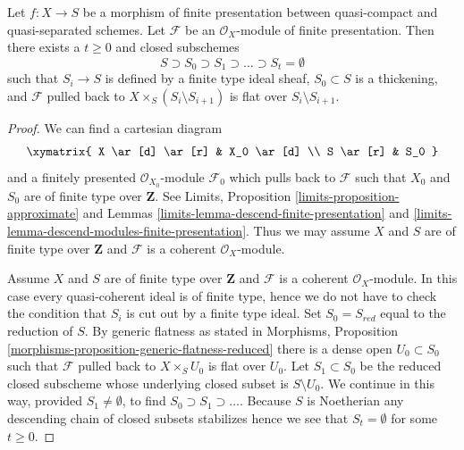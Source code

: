 \begin{lemma}
\label{lemma-generic-flatness-stratification}
Let $f : X \to S$ be a morphism of finite presentation between quasi-compact
and quasi-separated schemes. Let $\mathcal{F}$ be an $\mathcal{O}_X$-module
of finite presentation. Then there exists a $t \geq 0$ and closed
subschemes
$$
S \supset S_0 \supset S_1 \supset \ldots \supset S_t = \emptyset
$$
such that $S_i \to S$ is defined by a finite type ideal sheaf,
$S_0 \subset S$ is a thickening, and $\mathcal{F}$ pulled back to
$X \times_S (S_i \setminus S_{i + 1})$ is flat over $S_i \setminus S_{i + 1}$.
\end{lemma}

\begin{proof}
We can find a cartesian diagram
$$
\xymatrix{
X \ar[d] \ar[r] & X_0 \ar[d] \\
S \ar[r] & S_0
}
$$
and a finitely presented $\mathcal{O}_{X_0}$-module $\mathcal{F}_0$
which pulls back to $\mathcal{F}$ such that $X_0$ and $S_0$ are of
finite type over $\mathbf{Z}$. See
Limits, Proposition \ref{limits-proposition-approximate} and
Lemmas \ref{limits-lemma-descend-finite-presentation} and
\ref{limits-lemma-descend-modules-finite-presentation}.
Thus we may assume $X$ and $S$ are of finite type over $\mathbf{Z}$
and $\mathcal{F}$ is a coherent $\mathcal{O}_X$-module.

\medskip\noindent
Assume $X$ and $S$ are of finite type over $\mathbf{Z}$
and $\mathcal{F}$ is a coherent $\mathcal{O}_X$-module.
In this case every quasi-coherent ideal is of finite type, hence
we do not have to check the condition that $S_i$ is cut out
by a finite type ideal. Set $S_0 = S_{red}$ equal to the reduction of $S$.
By generic flatness as stated in Morphisms, Proposition
\ref{morphisms-proposition-generic-flatness-reduced}
there is a dense open $U_0 \subset S_0$ such that $\mathcal{F}$
pulled back to $X \times_S U_0$ is flat over $U_0$.
Let $S_1 \subset S_0$ be the reduced closed subscheme whose
underlying closed subset is $S \setminus U_0$. We continue in this
way, provided $S_1 \not = \emptyset$, to find
$S_0 \supset S_1 \supset \ldots$. Because $S$
is Noetherian any descending chain of closed subsets stabilizes
hence we see that $S_t = \emptyset$ for some $t \geq 0$.
\end{proof}
